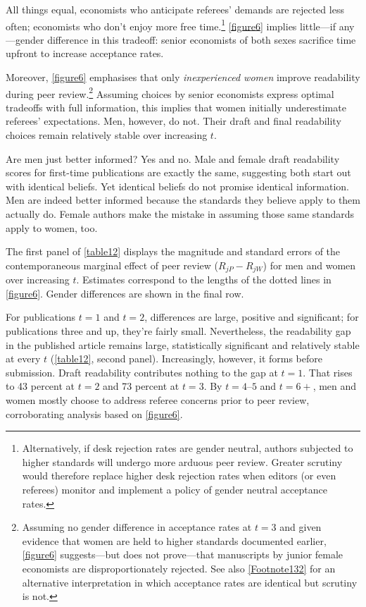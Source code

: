 All things equal, economists who anticipate referees' demands are rejected less often; economists who don't enjoy more free time.\footnote{\label{Footnote132}Alternatively, if desk rejection rates are gender neutral, authors subjected to higher standards will undergo more arduous peer review. Greater scrutiny would therefore replace higher desk rejection rates when editors (or even referees) monitor and implement a policy of gender neutral acceptance rates.} \autoref{figure6} implies little---if any---gender difference in this tradeoff: senior economists of both sexes sacrifice time upfront to increase acceptance rates.



Moreover, \autoref{figure6} emphasises that only \emph{inexperienced women} improve readability during peer review.\footnote{Assuming no gender difference in acceptance rates at $t=3$ and given evidence that women are held to higher standards documented earlier, \autoref{figure6} suggests---but does not prove---that manuscripts by junior female economists are disproportionately rejected. See also \autoref{Footnote132} for an alternative interpretation in which acceptance rates are identical but scrutiny is not.} Assuming choices by senior economists express optimal tradeoffs with full information, this implies that women initially underestimate referees' expectations. Men, however, do not. Their draft and final readability choices remain relatively stable over increasing $t$.

Are men just better informed? Yes and no. Male and female draft readability scores for first-time publications are exactly the same, suggesting both start out with identical beliefs. Yet identical beliefs do not promise identical information. Men are indeed better informed because the standards they believe apply to them actually do. Female authors make the mistake in assuming those same standards apply to women, too.

The first panel of \autoref{table12} displays the magnitude and standard errors of the contemporaneous marginal effect of peer review ($R_{jP}-R_{jW}$) for men and women over increasing $t$. Estimates correspond to the lengths of the dotted lines in \autoref{figure6}. Gender differences are shown in the final row.



For publications $t=1$ and $t=2$, differences are large, positive and significant; for publications three and up, they're fairly small. Nevertheless, the readability gap in the published article remains large, statistically significant and relatively stable at every $t$ (\autoref{table12}, second panel). Increasingly, however, it forms before submission. Draft readability contributes nothing to the gap at $t=1$. That rises to 43 percent at $t=2$ and 73 percent at $t=3$. By $t=4\text{--}5$ and $t=6+$, men and women mostly choose to address referee concerns prior to peer review, corroborating analysis based on \autoref{figure6}. 


